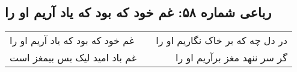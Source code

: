 \begin{center}
\section*{رباعی شماره ۵۸: غم خود که بود که یاد آریم او را}
\label{sec:0058}
\begin{longtable}{l p{0.5cm} r}
غم خود که بود که یاد آریم او را
&&
در دل چه که بر خاک نگاریم او را
\\
غم باد امید لیک بس بیمغز است
&&
گر سر ننهد مغز برآریم او را
\\
\end{longtable}
\end{center}
